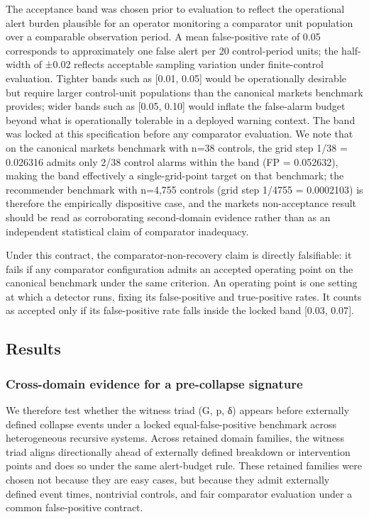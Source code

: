 \documentclass[
  11pt,
]{article}
\begin{document}
The acceptance band was chosen prior to evaluation to reflect the
operational alert burden plausible for an operator monitoring a
comparator unit population over a comparable observation period. A mean
false-positive rate of 0.05 corresponds to approximately one false alert
per 20 control-period units; the half-width of ±0.02 reflects acceptable
sampling variation under finite-control evaluation. Tighter bands such
as {[}0.01, 0.05{]} would be operationally desirable but require larger
control-unit populations than the canonical markets benchmark provides;
wider bands such as {[}0.05, 0.10{]} would inflate the false-alarm
budget beyond what is operationally tolerable in a deployed warning
context. The band was locked at this specification before any comparator
evaluation. We note that on the canonical markets benchmark with n=38
controls, the grid step 1/38 = 0.026316 admits only 2/38 control alarms
within the band (FP = 0.052632), making the band effectively a
single-grid-point target on that benchmark; the recommender benchmark
with n=4,755 controls (grid step 1/4755 = 0.0002103) is therefore the
empirically dispositive case, and the markets non-acceptance result
should be read as corroborating second-domain evidence rather than as an
independent statistical claim of comparator inadequacy.

Under this contract, the comparator-non-recovery claim is directly
falsifiable: it fails if any comparator configuration admits an accepted
operating point on the canonical benchmark under the same criterion. An
operating point is one setting at which a detector runs, fixing its
false-positive and true-positive rates. It counts as accepted only if
its false-positive rate falls inside the locked band {[}0.03, 0.07{]}.

\subsection{Results}\label{results}

\subsubsection{Cross-domain evidence for a pre-collapse
signature}\label{cross-domain-evidence-for-a-pre-collapse-signature}

We therefore test whether the witness triad (G, p, δ) appears before
externally defined collapse events under a locked equal-false-positive
benchmark across heterogeneous recursive systems. Across retained domain
families, the witness triad aligns directionally ahead of externally
defined breakdown or intervention points and does so under the same
alert-budget rule. These retained families were chosen not because they
are easy cases, but because they admit externally defined event times,
nontrivial controls, and fair comparator evaluation under a common
false-positive contract.
\end{document}
